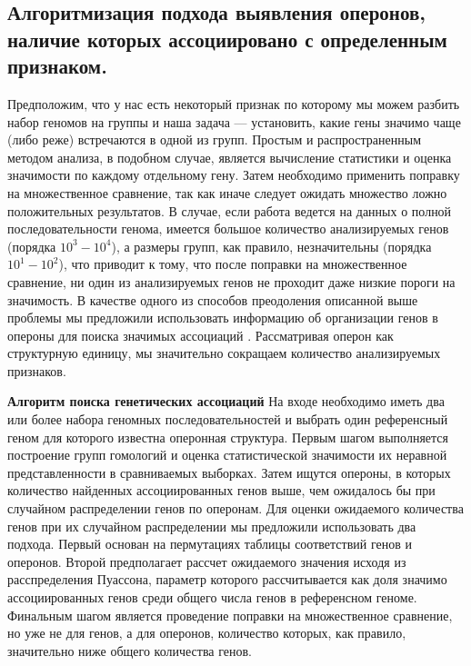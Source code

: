 \subsection*{Алгоритмизация подхода выявления оперонов, наличие которых ассоциировано с определенным признаком. } \label{chaptOperons}

Предположим, что у нас есть некоторый признак по которому мы можем разбить набор геномов на группы и наша задача --- установить, какие гены значимо чаще (либо реже) встречаются в одной из групп. Простым и распространенным методом анализа, в подобном случае, является вычисление статистики и оценка значимости по каждому отдельному гену. Затем необходимо применить поправку на множественное сравнение, так как иначе следует ожидать множество ложно положительных результатов. В случае, если работа ведется на данных о полной последовательности генома, имеется большое количество анализируемых генов (порядка $10^3 - 10^4$), а размеры групп, как правило, незначительны (порядка $10^1 - 10^2$), что приводит к тому, что после поправки на множественное сравнение, ни один из анализируемых генов не проходит даже низкие пороги на значимость. В качестве одного из способов преодоления описанной выше проблемы мы предложили использовать информацию об организации генов в опероны для поиска значимых ассоциаций \cite{rakitina2017genome}. Рассматривая оперон как структурную единицу, мы значительно сокращаем количество анализируемых признаков.

\textbf{Алгоритм поиска генетических ассоциаций}
На входе необходимо иметь два или более набора геномных последовательностей и выбрать один референсный геном для которого известна оперонная структура. Первым шагом выполняется построение групп гомологий и оценка статистической значимости их неравной представленности в сравниваемых выборках. Затем ищутся опероны, в которых количество найденных ассоциированных генов выше, чем ожидалось бы при случайном распределении генов по оперонам. Для оценки ожидаемого количества генов при их случайном распределении мы предложили использовать два подхода. Первый основан на пермутациях таблицы соответствий генов и оперонов. Второй предполагает рассчет ожидаемого значения исходя из расспределения Пуассона, параметр которого рассчитывается как доля значимо ассоциированных генов среди общего числа генов в референсном геноме. Финальным шагом является проведение поправки на множественное сравнение, но уже не для генов, а для оперонов, количество которых, как правило, значительно ниже общего количества генов. 

